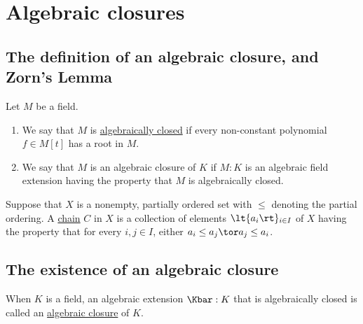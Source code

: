 \documentclass{article}
\begin{document}
\section{Algebraic closures}
\subsection{The definition of an algebraic closure, and Zorn's Lemma}
  \begin{tdefinition}
    Let \( M \) be a field. \begin{enumerate}[label=(\roman*)]
      \item We say that \( M \) is \ul{algebraically closed} if every non-constant polynomial \( f\in M[t] \) has a root in \( M \).
      \item We say that \( M \) is an algebraic closure of \( K \) if \( M:K \) is an algebraic field extension having the property that \( M \) is algebraically closed.
    \end{enumerate}
  \end{tdefinition}

  \begin{tdefinition}[Chain]
    Suppose that \( X \) is a nonempty, partially ordered set with \( \leq \) denoting the partial ordering.
    A \ul{chain} \( C \) in \( X \) is a collection of elements \( \lt\{ a_i \rt\}_{i\in I} \) of \( X \) having the property that for every \( i,j\in I \), either \( a_i\leq a_j \tor a_j\leq a_i \).
  \end{tdefinition}

\subsection{The existence of an algebraic closure}
  \begin{tdefinition}
    When \( K \) is a field, an algebraic extension \( \Kbar:K \) that is algebraically closed is called an \ul{algebraic closure} of \( K \).
  \end{tdefinition}
\end{document}
